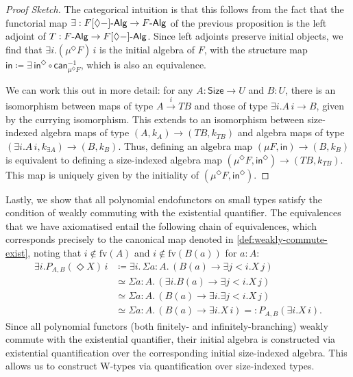 \documentclass[10pt,a4paper]{article}
\theoremstyle{definition}
\theoremstyle{remark}
\renewcommand{\.}{.\,} %
\renewcommand{\:}{:} %
\newcommand{\Size}{\mathsf{Size}}
\newcommand{\F}{F}
\newcommand{\FAlg}{F\text-\sf{Alg}}
\newcommand{\sFAlg}{F[\Diamond{-}]\text-\sf{Alg}}
\newcommand{\In}{\mathsf{in}}
\newcommand{\sto}{\overset{i}{\to}}
\newcommand{\0}{\mathbf{0}}
\newcommand{\1}{\mathbf{1}}
\newcommand\<\langle
\renewcommand\>\rangle
\renewcommand\sf\mathsf
\theoremstyle{remark}
\begin{document}
\begin{proof}[Proof Sketch]
    The categorical intuition is that this follows from the fact that the functorial map $\exists : \sFAlg \to \FAlg$ of the previous proposition is the left adjoint of $T : \FAlg \to \sFAlg$.
    Since left adjoints preserve initial objects, we find that $\exists i. (\mu^\Diamond F) \, i$ is the initial algebra of $F$, with the structure map $\In \coloneq  \exists \, \In^\Diamond \circ \mathsf{can}^{-1}_{\mu^\Diamond F}$, which is also an equivalence.

    We can work this out in more detail: for any $A : \Size \to U$ and $B : U$, there is an isomorphism between maps of type $A \sto TB$ and those of type $\exists i . A \, i \to B$, given by the currying isomorphism. This extends to an isomorphism between size-indexed algebra maps of type $(A, k_A) \to (TB, k_{TB})$ and algebra maps of type $(\exists i . A \, i, k_{\exists A}) \to (B, k_B)$. Thus, defining an algebra map $(\mu \F, \In) \to (B, k_B)$ is equivalent to defining a size-indexed algebra map $(\mu^\Diamond F, \In^\Diamond) \to (TB, k_{TB})$. This map is uniquely given by the initiality of $(\mu^\Diamond F, \In^\Diamond)$.  
\end{proof}

Lastly, we show that all polynomial endofunctors on small types satisfy the condition of weakly commuting with the existential quantifier.
The equivalences that we have axiomatised entail the following chain of equivalences, which corresponds precisely to the canonical map denoted in \autoref{def:weakly-commute-exist}, noting that $i \notin \text{fv}(A)$ and $i \notin \text{fv}(B(a))$ for $a : A$:
\begin{align*}
    \exists i . P_{A,B}(\Diamond X) \, i &\coloneq  \exists i \. \Sigma {a : A}  \. (B(a) \to \exists j < i . X \, j) \\
    &\simeq \Sigma {a : A} \. (\exists i . B(a) \to \exists j < i . X \, j)\\
    &\simeq \Sigma {a : A} \. (B(a) \to \exists i . \exists j < i . X \, j)\\
    &\simeq \Sigma {a : A} \. (B(a) \to \exists i . X \, i) =: P_{A,B}(\exists i . X \, i).
\end{align*}
Since all polynomial functors (both finitely- and infinitely-branching) weakly commute with the existential quantifier, their initial algebra is constructed via existential quantification over the corresponding initial size-indexed algebra. This allows us to construct W-types via quantification over size-indexed types.
\end{document}
